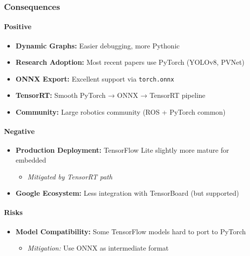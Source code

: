 \documentclass[
]{article}
\providecommand{\tightlist}{%
  \setlength{\itemsep}{0pt}\setlength{\parskip}{0pt}}
\begin{document}
\hypertarget{consequences-2}{%
\subsubsection{Consequences}\label{consequences-2}}

\hypertarget{positive-2}{%
\paragraph{Positive}\label{positive-2}}

\begin{itemize}
\tightlist
\item
  \textbf{Dynamic Graphs:} Easier debugging, more Pythonic
\item
  \textbf{Research Adoption:} Most recent papers use PyTorch (YOLOv8,
  PVNet)
\item
  \textbf{ONNX Export:} Excellent support via \texttt{torch.onnx}
\item
  \textbf{TensorRT:} Smooth PyTorch → ONNX → TensorRT pipeline
\item
  \textbf{Community:} Large robotics community (ROS + PyTorch common)
\end{itemize}

\hypertarget{negative-2}{%
\paragraph{Negative}\label{negative-2}}

\begin{itemize}
\tightlist
\item
  \textbf{Production Deployment:} TensorFlow Lite slightly more mature
  for embedded

  \begin{itemize}
  \tightlist
  \item
    \emph{Mitigated by TensorRT path}
  \end{itemize}
\item
  \textbf{Google Ecosystem:} Less integration with TensorBoard (but
  supported)
\end{itemize}

\hypertarget{risks-2}{%
\paragraph{Risks}\label{risks-2}}

\begin{itemize}
\tightlist
\item
  \textbf{Model Compatibility:} Some TensorFlow models hard to port to
  PyTorch

  \begin{itemize}
  \tightlist
  \item
    \emph{Mitigation:} Use ONNX as intermediate format
  \end{itemize}
\end{itemize}
\end{document}
